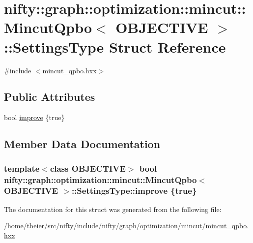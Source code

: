 \hypertarget{structnifty_1_1graph_1_1optimization_1_1mincut_1_1MincutQpbo_1_1SettingsType}{}\section{nifty\+:\+:graph\+:\+:optimization\+:\+:mincut\+:\+:Mincut\+Qpbo$<$ O\+B\+J\+E\+C\+T\+I\+V\+E $>$\+:\+:Settings\+Type Struct Reference}
\label{structnifty_1_1graph_1_1optimization_1_1mincut_1_1MincutQpbo_1_1SettingsType}


{\ttfamily \#include $<$mincut\+\_\+qpbo.\+hxx$>$}

\subsection*{Public Attributes}
\begin{DoxyCompactItemize}
\item 
bool \hyperlink{structnifty_1_1graph_1_1optimization_1_1mincut_1_1MincutQpbo_1_1SettingsType_a8f1a583dc43d67fe2eb376286cc690d8}{improve} \{true\}
\end{DoxyCompactItemize}


\subsection{Member Data Documentation}
\hypertarget{structnifty_1_1graph_1_1optimization_1_1mincut_1_1MincutQpbo_1_1SettingsType_a8f1a583dc43d67fe2eb376286cc690d8}{}
\subsubsection[{improve}]{\setlength{\rightskip}{0pt plus 5cm}template$<$class O\+B\+J\+E\+C\+T\+I\+V\+E$>$ bool {\bf nifty\+::graph\+::optimization\+::mincut\+::\+Mincut\+Qpbo}$<$ O\+B\+J\+E\+C\+T\+I\+V\+E $>$\+::Settings\+Type\+::improve \{true\}}\label{structnifty_1_1graph_1_1optimization_1_1mincut_1_1MincutQpbo_1_1SettingsType_a8f1a583dc43d67fe2eb376286cc690d8}


The documentation for this struct was generated from the following file\+:\begin{DoxyCompactItemize}
\item 
/home/tbeier/src/nifty/include/nifty/graph/optimization/mincut/\hyperlink{mincut__qpbo_8hxx}{mincut\+\_\+qpbo.\+hxx}\end{DoxyCompactItemize}
